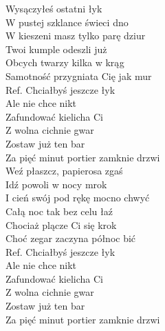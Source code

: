 
Wysączyłeś ostatni łyk \tab{}  \\
W pustej szklance świeci dno \tab{} \\
W kieszeni masz tylko parę dziur   \\
Twoi kumple odeszli już \tab{} \\
Obcych twarzy kilka w krąg \tab{}\\
Samotność przygniata Cię jak mur \\
\hops
Ref. Chciałbyś jeszcze łyk \tab{} \\
 Ale nie chce nikt \tab{}  \\
 Zafundować kielicha Ci \tab{}\\
 Z wolna cichnie gwar \tab{}\\
 Zostaw już ten bar \tab{}\\
 Za pięć minut portier zamknie drzwi \\
\hops
Weź płaszcz, papierosa zgaś \\
Idź powoli w nocy mrok \\
I cień swój pod rękę mocno chwyć \\
Całą noc tak bez celu łaź \\
Chociaż plącze Ci się krok \\
Choć zegar zaczyna północ bić \\
\hops
Ref. Chciałbyś jeszcze łyk  \\
 Ale nie chce nikt   \\
 Zafundować kielicha Ci \\
 Z wolna cichnie gwar \\
 Zostaw już ten bar \\
 Za pięć minut portier zamknie drzwi 